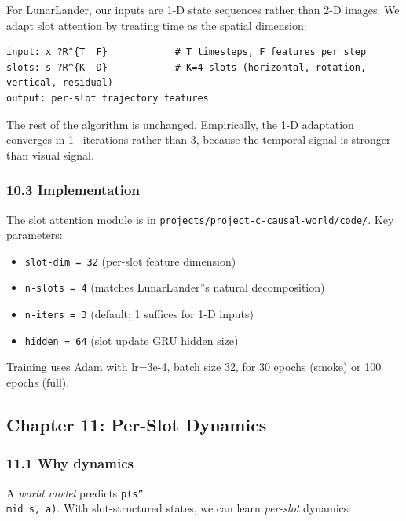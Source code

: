 \documentclass[11pt]{article}
\begin{document}
For LunarLander, our inputs are 1-D state sequences rather than 2-D images.
We adapt slot attention by treating time as the spatial dimension:

\begin{verbatim}
input: x ?R^{T  F}            # T timesteps, F features per step
slots: s ?R^{K  D}            # K=4 slots (horizontal, rotation, vertical, residual)
output: per-slot trajectory features
\end{verbatim}

\begin{sloppypar}
The rest of the algorithm is unchanged. Empirically, the 1-D adaptation
converges in 1-- iterations rather than 3, because the temporal signal is
stronger than visual signal.
\end{sloppypar}

\subsubsection{10.3 Implementation}

The slot attention module is in \texttt{projects/project-c-causal-world/code/}.
Key parameters:

\begin{itemize}
  \item \texttt{slot-dim = 32} (per-slot feature dimension)
  \item \texttt{n-slots = 4} (matches LunarLander''s natural decomposition)
  \item \texttt{n-iters = 3} (default; 1 suffices for 1-D inputs)
  \item \texttt{hidden = 64} (slot update GRU hidden size)
\end{itemize}


Training uses Adam with lr=3e-4, batch size 32, for 30 epochs (smoke) or 100
epochs (full).

\hrulefill

\subsection{Chapter 11: Per-Slot Dynamics}

\subsubsection{11.1 Why dynamics}

A \textit{world model} predicts \texttt{p(s''\\mid s, a)}. With slot-structured states, we can learn
\textit{per-slot} dynamics:
\end{document}
